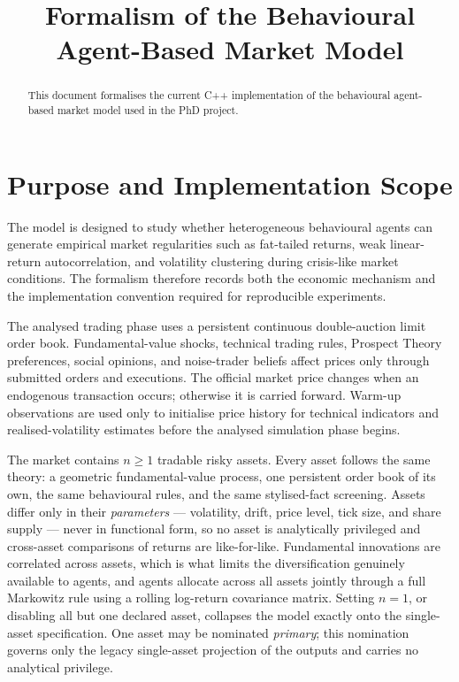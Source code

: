 \documentclass[12pt, a4paper]{article}
\title{Formalism of the Behavioural Agent-Based Market Model}
\author{}
\date{}
\begin{document}
    \maketitle

    \begin{abstract}
        This document formalises the current C++ implementation of the behavioural
        agent-based market model used in the PhD project.
    \end{abstract}

    \tableofcontents
    \clearpage

    \section{Purpose and Implementation Scope}\label{sec:purpose_scope}

    The model is designed to study whether heterogeneous behavioural agents can
    generate empirical market regularities such as fat-tailed returns, weak
    linear-return autocorrelation, and volatility clustering during crisis-like
    market conditions. The formalism therefore records both the economic mechanism
    and the implementation convention required for reproducible experiments.

    The analysed trading phase uses a persistent continuous double-auction limit
    order book. Fundamental-value shocks, technical trading rules, Prospect Theory
    preferences, social opinions, and noise-trader beliefs affect prices only
    through submitted orders and executions. The official market price changes when
    an endogenous transaction occurs; otherwise it is carried forward. Warm-up
    observations are used only to initialise price history for technical indicators
    and realised-volatility estimates before the analysed simulation phase begins.

    The market contains \(n\ge 1\) tradable risky assets. Every asset follows the
    same theory: a geometric fundamental-value process, one persistent order book
    of its own, the same behavioural rules, and the same stylised-fact screening.
    Assets differ only in their \emph{parameters} --- volatility, drift, price
    level, tick size, and share supply --- never in functional form, so no asset
    is analytically privileged and cross-asset comparisons of returns are
    like-for-like. Fundamental innovations are correlated across assets, which is
    what limits the diversification genuinely available to agents, and agents
    allocate across all assets jointly through a full Markowitz rule using a
    rolling log-return covariance matrix. Setting \(n=1\), or disabling all but
    one declared asset, collapses the model exactly onto the single-asset
    specification. One asset may be nominated \emph{primary}; this nomination
    governs only the legacy single-asset projection of the outputs and carries no
    analytical privilege.
\end{document}
